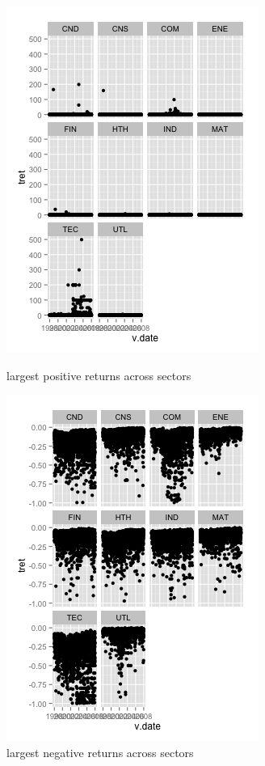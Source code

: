 \begin{figure}[ht]
\centering
\begin{minipage}[b]{0.45\linewidth}
\includegraphics[width=.8\linewidth]{DEMO1}
\caption{largest positive returns across sectors}
\end{minipage}
\quad
\begin{minipage}[b]{0.45\linewidth}
\includegraphics[width=.8\linewidth]{DEMO2}
\caption{largest negative returns across sectors}
\end{minipage}
\end{figure}

